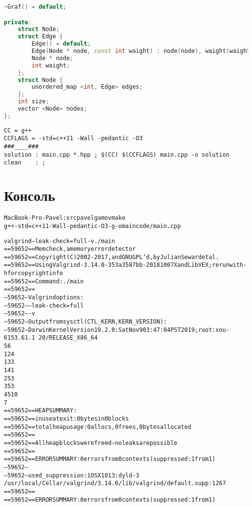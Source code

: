 \begin{lstlisting}[language=C++]
    ~Graf() = default;

private:
    struct Node;
    struct Edge {
        Edge() = default;
        Edge(Node * node, const int waight) : node(node), waight(waight) {}
        Node * node;
        int waight;
    };
    struct Node {
        unordered_map <int, Edge> edges;
    };
    int size;
    vector <Node> nodes;
};
\end{lstlisting}

\lstset{language=[gnu] make}

\begin{lstlisting}
CC = g++
CCFLAGS = -std=c++11 -Wall -pedantic -O3
###____###
solution : main.cpp *.hpp ; $(CC) $(CCFLAGS) main.cpp -o solution
clean	 : ;

\end{lstlisting}

\pagebreak

\section{Консоль}

\begin{alltt}
MacBook-Pro-Pavel:src pavelgamov make
g++ -std=c++11 -Wall -pedantic -O3 -g -o main code/main.cpp

valgrind --leak-check=full -v ./main
==59652== Memcheck, a memory error detector
==59652== Copyright (C) 2002-2017, and GNU GPL'd, by Julian Seward et al.
==59652== Using Valgrind-3.14.0-353a3587bb-20181007X and LibVEX; rerun with -h for copyright info
==59652== Command: ./main
==59652== 
--59652-- Valgrind options:
--59652--    --leak-check=full
--59652--    -v
--59652-- Output from sysctl({CTL_KERN,KERN_VERSION}):
--59652--   Darwin Kernel Version 19.2.0: Sat Nov  9 03:47:04 PST 2019; root:xnu-6153.61.1~20/RELEASE_X86_64
5 6
1 2 4
1 3 3
1 4 1
2 5 3
3 5 3
4 5 10
7
==59652== HEAP SUMMARY:
==59652==     in use at exit: 0 bytes in 0 blocks
==59652==   total heap usage: 0 allocs, 0 frees, 0 bytes allocated
==59652== 
==59652== All heap blocks were freed -- no leaks are possible
==59652== 
==59652== ERROR SUMMARY: 0 errors from 0 contexts (suppressed: 1 from 1)
--59652-- 
--59652-- used_suppression:      1 OSX1013:dyld-3 \\ /usr/local/Cellar/valgrind/3.14.0/lib/valgrind/default.supp:1267
==59652== 
==59652== ERROR SUMMARY: 0 errors from 0 contexts (suppressed: 1 from 1)
\end{alltt}

\pagebreak